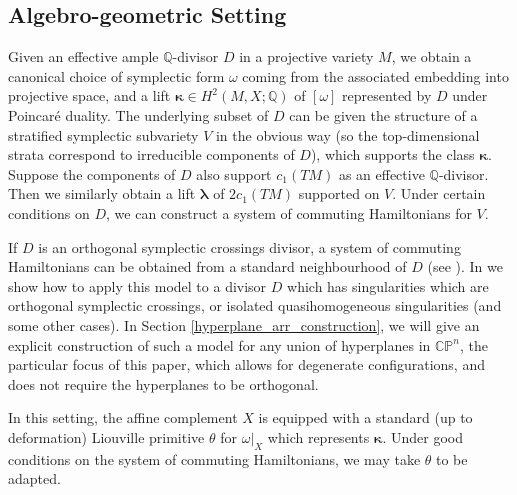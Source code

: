 \documentclass{article}
\numberwithin{equation}{section}
\numberwithin{figure}{section}
\begin{document}
\subsection{Algebro-geometric Setting}
Given an effective ample $\mathbb{Q}$-divisor $D$ in a projective variety $M$, we obtain a canonical choice of symplectic form $\omega$ coming from the associated embedding into projective space, and a lift $\pmb{\kappa}\in H^2(M,X;\mathbb{Q})$ of $[\omega]$ represented by $D$ under Poincar\'e duality. The underlying subset of $D$ can be given the structure of a stratified symplectic subvariety $V$ in the obvious way (so the top-dimensional strata correspond to irreducible components of $D$), which supports the class $\pmb{\kappa}$. Suppose the components of $D$ also support $c_1(TM)$ as an effective $\mathbb{Q}$-divisor. Then we similarly obtain a lift $\pmb{\lambda}$ of $2c_1(TM)$ supported on $V$. Under certain conditions on $D$, we can construct a system of commuting Hamiltonians for $V$.

If $D$ is an orthogonal symplectic crossings divisor, a system of commuting Hamiltonians can be obtained from a standard neighbourhood of $D$ (see \cite{TMZ}). In \cite{Ga} we show how to apply this model to a divisor $D$ which has singularities which are orthogonal symplectic crossings, or isolated quasihomogeneous singularities (and some other cases). In Section \ref{hyperplane_arr_construction}, we will give an explicit construction of such a model for any union of hyperplanes in $\mathbb{CP}^n$, the particular focus of this paper, which allows for degenerate configurations, and does not require the hyperplanes to be orthogonal.

In this setting, the affine complement $X$ is equipped with a standard (up to deformation) Liouville primitive $\theta$ for $\omega|_X$ which represents $\pmb{\kappa}$. Under good conditions on the system of commuting Hamiltonians, we may take $\theta$ to be adapted.
\end{document}
